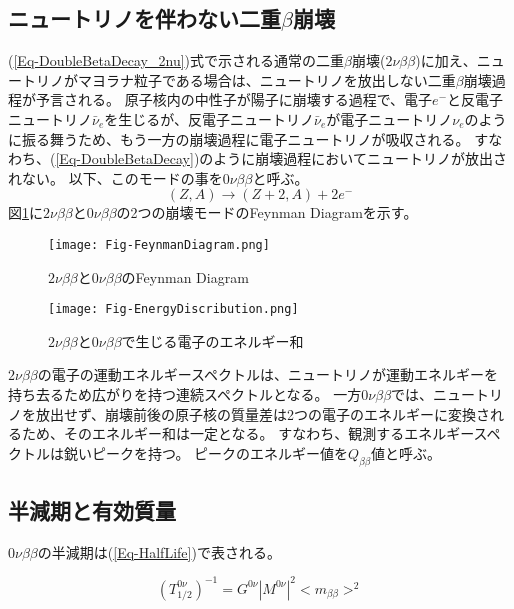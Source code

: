 \documentclass[a4paper,10pt]{jreport}
\begin{document}
\subsection{ニュートリノを伴わない二重$\beta$崩壊}

(\ref{Eq-DoubleBetaDecay_2nu})式で示される通常の二重$\beta$崩壊($2\nu\beta\beta$)に加え、ニュートリノがマヨラナ粒子である場合は、ニュートリノを放出しない二重$\beta$崩壊過程が予言される。
原子核内の中性子が陽子に崩壊する過程で、電子$e^-$と反電子ニュートリノ$\bar{\nu}_e$を生じるが、反電子ニュートリノ$\bar{\nu}_e$が電子ニュートリノ$\nu_e$のように振る舞うため、もう一方の崩壊過程に電子ニュートリノが吸収される。
すなわち、(\ref{Eq-DoubleBetaDecay})のように崩壊過程においてニュートリノが放出されない。
以下、このモードの事を$0\nu\beta\beta$と呼ぶ。
\begin{equation} \label{Eq-DoubleBetaDecay}
	(Z,A)\to(Z+2,A)+2e^-
\end{equation}
図\ref{Fig-FeynmanDiagram}に$2\nu\beta\beta$と$0\nu\beta\beta$の2つの崩壊モードのFeynman Diagramを示す。

\begin{figure}[H]
	\center
	\texttt{[image: Fig-FeynmanDiagram.png]}
	\caption{$2\nu\beta\beta$と$0\nu\beta\beta$のFeynman Diagram} \label{Fig-FeynmanDiagram}
\end{figure}

\begin{figure}[H]
	\center
	\texttt{[image: Fig-EnergyDiscribution.png]}
	\caption{$2\nu\beta\beta$と$0\nu\beta\beta$で生じる電子のエネルギー和} \label{Fig-EnergyDiscribution}
\end{figure}

$2\nu\beta\beta$の電子の運動エネルギースペクトルは、ニュートリノが運動エネルギーを持ち去るため広がりを持つ連続スペクトルとなる。
一方$0\nu\beta\beta$では、ニュートリノを放出せず、崩壊前後の原子核の質量差は2つの電子のエネルギーに変換されるため、そのエネルギー和は一定となる。
すなわち、観測するエネルギースペクトルは鋭いピークを持つ。
ピークのエネルギー値を$Q_{\beta\beta}$値と呼ぶ。




\subsection{半減期と有効質量}

$0\nu\beta\beta$の半減期は(\ref{Eq-HalfLife})で表される。

\begin{equation} \label{Eq-HalfLife}
	\left(T_{1/2}^{0\nu}\right)^{-1} = G^{0\nu}|M^{0\nu}|^2<m_{\beta\beta}>^2
\end{equation}
\end{document}
